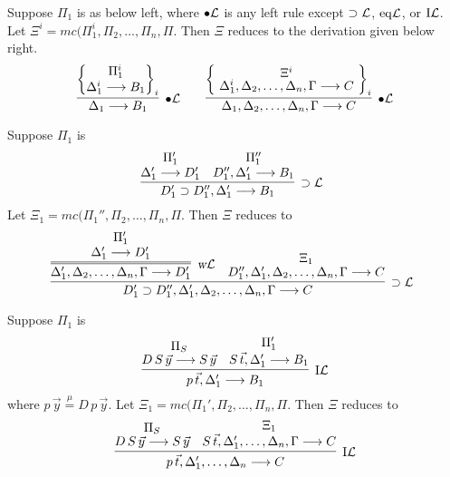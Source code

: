 \documentclass[preprint]{elsarticle}
\newcommand{\Seq}[2]{#1\longrightarrow #2}
\newcommand{\bulletL}{\bullet{\cal L}}
\newcommand{\circL}{\circ{\cal L}}
\newcommand{\defmu}{\stackrel{\mu}{=}}
\newcommand{\eqL}{{\rm eq}{\cal L}}
\newcommand{\indL}{{\rm I}{\cal L}}
\newcommand{\oimpL}{\oimp{\cal L}}
\newcommand{\oimp}{\supset}
\newcommand{\wL}{\hbox{\sl w}{\cal L}}
\begin{document}
\begin{trivlist}

\item[\fbox{$\bulletL/\circL$}] Suppose $\Pi_1$ is as below left, 
  where $\bulletL$ is any left rule except $\oimpL$, $\eqL$, or
  $\indL$.  Let $\Xi^i = mc(\Pi_1^i,\Pi_2,\ldots,\Pi_n,\Pi$.
  Then $\Xi$ reduces to the derivation given below right. 
  \begin{displaymath}
    \infer[\bulletL]
          {\Seq{\Delta_1}{B_1}}
          {\left\{\raisebox{-1.5ex}{\deduce{\Seq{\Delta_1^i}{B_1}}
              {\Pi_1^i}}\right\}_i
          }
    \qquad
    \infer[\bulletL]
          {\Seq{\Delta_1,\Delta_2,\ldots,\Delta_n,\Gamma}{C}}
          {
            \left\{
            \raisebox{-1.3ex}{
              \deduce{\Seq{\Delta_1^i,\Delta_2,\ldots,\Delta_n,\Gamma}{C}}{\Xi^i}
            }
            \right\}_i
          }
  \end{displaymath}



\item[\fbox{$\oimpL/\circL$}] Suppose $\Pi_1$ is
  \begin{displaymath}
    \infer[\oimpL]{\Seq{D_1' \oimp D_1'',\Delta_1'}{B_1}}
    {\deduce{\Seq{\Delta_1'}{D_1'}}
      {\Pi_1'}
      & \deduce{\Seq{D_1'',\Delta_1'}{B_1}}
      {\Pi_1''}}
    \enspace 
  \end{displaymath}
  Let $\Xi_1 = mc(\Pi_1'',\Pi_2,\ldots,\Pi_n, \Pi$. 
Then $\Xi$ reduces to
  \begin{displaymath}
    \infer[\oimpL]
    {\Seq{D_1' \oimp D_1'',\Delta_1',\Delta_2,\ldots,\Delta_n,\Gamma}{C}}
    {
      \infer=[\wL]
      {\Seq{\Delta_1',\Delta_2,\ldots,\Delta_n,\Gamma}{D_1'}}
      {\deduce{\Seq{\Delta_1'}{D_1'}}{\Pi_1'} }
      & 
      \deduce{\Seq{D_1'',\Delta_1',\Delta_2,\ldots,\Delta_n,\Gamma}{C}}{\Xi_1}
    }
    \enspace 
  \end{displaymath}

\item[\fbox{$\indL/\circL$}] Suppose $\Pi_1$ is 
$$
\infer[\indL] {\Seq{p\,\vec{t}, \Delta_1'}{B_1}} {
  \deduce{\Seq{D\,S\,\vec{y}}{S\,\vec{y}}}{\Pi_S} &
  \deduce{\Seq{S\,\vec{t}, \Delta_1'}{B_1}}{\Pi_1'} }
$$      
where $p\,\vec{y} \defmu D\,p\,\vec{y}$.  
Let $\Xi_1 = mc(\Pi_1',\Pi_2,\ldots,\Pi_n,\Pi$.
Then $\Xi$ reduces to
$$
\infer[\indL] {\Seq{p\,\vec{t}, \Delta_1',\dots,\Delta_n}{C}} {
  \deduce{\Seq{D\,S\,\vec{y}}{S\,\vec{y}}}{\Pi_S} &
  \deduce{\Seq{S\,\vec{t}, \Delta_1',\dots,\Delta_n,\Gamma}{C}}{\Xi_1}
}
$$      



\end{trivlist}
\end{document}
